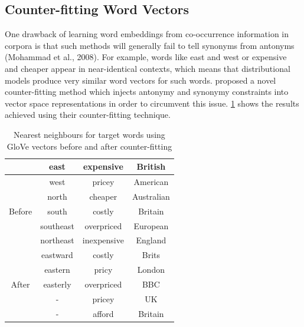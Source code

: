 \documentclass[12pt,a4paper] {article}
\begin{document}
	\subsection*{Counter-fitting Word Vectors}
	One drawback of learning word embeddings from
	co-occurrence information in corpora is that such methods will generally fail to tell synonyms from antonyms
	(Mohammad et al., 2008). For example, words like east and west or expensive and cheaper appear
	in near-identical contexts, which means that distributional
	models produce very similar word vectors for
	such words.  
	\cite{mrksic:2016:naacl} proposed a novel counter-fitting
	method which injects antonymy and synonymy
	constraints into vector space representations in
	order to circumvent this issue. \ref{tab:counter_fitting} shows the results \cite{mrksic:2016:naacl} achieved using their counter-fitting technique.
	\begin{table}[h]
	\begin{center}
		\begin{tabular}{ c c c c } 
			\hline
			 & east & expensive & British \\
			\hline
			\multirow{5}{4em}{Before} &
		
		    west & pricey &  American
		    \\ 
			& north & cheaper & Australian\\ 
			& south & costly & Britain\\ 
			& southeast & overpriced & European\\
			& northeast & inexpensive & England\\
			\hline
			\multirow{5}{4em}{After} & 
			eastward & costly & Brits\\ 
			& eastern & pricy & London\\ 
			& easterly & overpriced & BBC\\ 
			& - & pricey & UK\\ 
			& - & afford & Britain\\ 
			\hline
		\end{tabular}
		
	\end{center}
	
	\caption{Nearest neighbours for target words using GloVe
		vectors before and after counter-fitting} \label{tab:counter_fitting}
\end{table}
	
	
	
\end{document}
